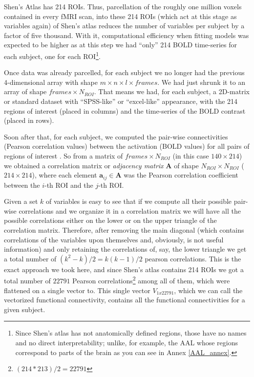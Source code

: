 \documentclass[a4paper,12pt]{elsarticle}  %
\begin{document}
Shen's Atlas has 214 ROIs. Thus, parcellation of the roughly one million voxels contained in every fMRI scan, into these 214 ROIs (which act at this stage as variables again) of Shen's atlas reduces the number of variables per subject by a factor of five thousand. With it, computational efficiency when fitting models was expected to be higher as at this step we had ``only'' 214 BOLD time-series for each subject, one for each ROI\footnote{Since Shen's atlas has not anatomically defined regions, those have no names and no direct interpretability; unlike, for example, the AAL whose regions correspond to parts of the brain as you can see in Annex \ref{AAL_annex}.}.

Once data was already parcelled, for each subject we no longer had the previous 4-dimensional array with shape $m \times n \times l \times frames$. We had just shrunk it to an array of shape $frames \times N_{ROI}$. That means we had, for each subject, a 2D-matrix or standard dataset with ``SPSS-like'' or ``excel-like'' appearance, with the 214 regions of interest (placed in columns) and the time-series of the BOLD contrast (placed in rows).

Soon after that, for each subject, we computed the pair-wise connectivities (Pearson correlation values) between the activation (BOLD values) for all pairs of regions of interest \cite{Rathore2017530}. So from a matrix of $frames \times N_{ROI}$ (in this case $140 \times 214$) we obtained a correlation matrix or \textit{adjacency matrix} $ \textbf{A} $ of shape $N_{ROI} \times N_{ROI}$ ($214 \times 214$), where each element $ \textbf{a}_{ij} \in \textbf{A} $  was the Pearson correlation coefficient between the $i$-th ROI and the $j$-th ROI.

Given a set $ k $ of variables is easy to see that if we compute all their possible pair-wise correlations and we organize it in a correlation matrix we will have all the possible correlations either on the lower or on the upper triangle of the correlation matrix. Therefore, after removing the main diagonal (which contains correlations of the variables upon themselves and, obviously, is not useful information) and only retaining the correlations of, say, the lower triangle we get a total number of $(k^{2} - k)/2 = k(k - 1)/2$ pearson correlations. This is the exact approach we took here, and since Shen's atlas contains 214 ROIs we got a total number of $22791$ Pearson correlations\footnote{$(214*213)/2 = 22791$} among all of them, which were flattened on a single vector to. This single vector $\textit{V}_{1x22791}$, which we can call the vectorized functional connectivity, contains all the functional connectivities for a given subject. 
\end{document}
